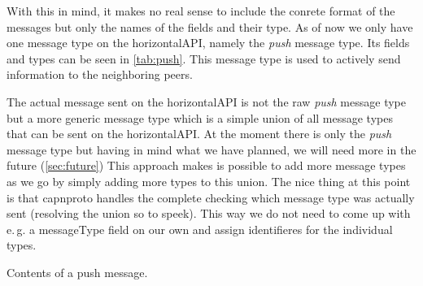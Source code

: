 \documentclass[a4paper,english,10pt,NET]{tumarticle}
\renewcommand{\eg}{\mbox{e.\,g.}\xspace} %
\begin{document}
With this in mind, it makes no real sense to include the conrete format of the messages but only the names of the fields and their type.
As of now we only have one message type on the horizontalAPI, namely the \emph{push} message type.
Its fields and types can be seen in \cref{tab:push}.
This message type is used to actively send information to the neighboring peers.

The actual message sent on the horizontalAPI is not the raw \emph{push} message type but a more generic message type which is a simple union of all message types that can be sent on the horizontalAPI.
At the moment there is only the \emph{push} message type but having in mind what we have planned, we will need more in the future (\cref{sec:future})
This approach makes is possible to add more message types as we go by simply adding more types to this union.
The nice thing at this point is that capnproto handles the complete checking which message type was actually sent (resolving the union so to speek).
This way we do not need to come up with \eg a messageType field on our own and assign identifieres for the individual types.

\begin{table}
	\centering
	
	\caption{Contents of a push message.}
	\label{tab:push}
\end{table}
\end{document}
